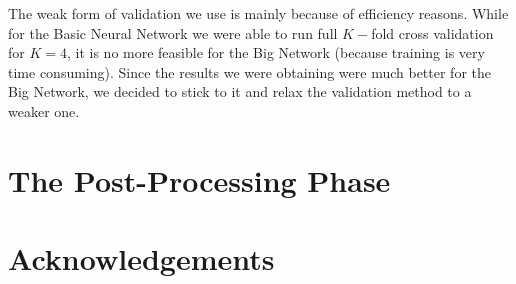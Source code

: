 \documentclass[10pt,conference,compsocconf]{IEEEtran}
\begin{document}
The weak form of validation we use is mainly because of efficiency reasons. While for the Basic Neural Network we were able to run full $K-$fold cross validation for $K=4$, it is no more feasible for the Big Network (because training is very time consuming). Since the results we were obtaining were much better for the Big Network, we decided to stick to it and relax the validation method to a weaker one.



\section{The Post-Processing Phase}



\section*{Acknowledgements}





\end{document}
